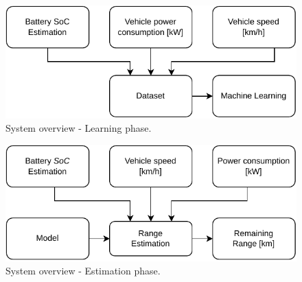 \begin{figure}[H]
    \begin{center}
        \includegraphics[scale=1.0]{../figures/generic_diagram_learn_phase}
        \caption{System overview - Learning phase.}
    \end{center}
\end{figure}

\begin{figure}[H]
    \begin{center}
        \includegraphics[scale=1.0]{../figures/generic_diagram_estimation_phase}
        \caption{System overview - Estimation phase.}
    \end{center}
\end{figure}
